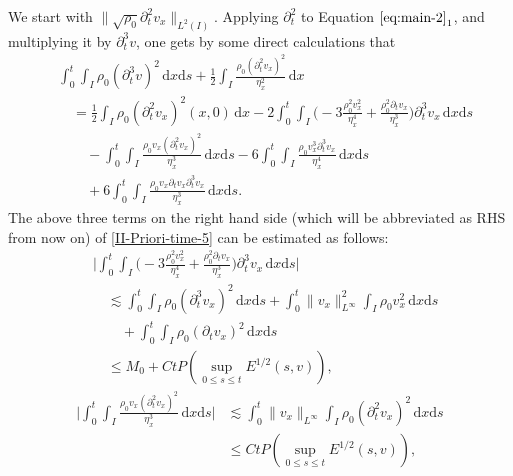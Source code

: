 \documentclass[11pt, reqno]{amsart}
\newcommand{\diff}{\mathrm{d}}
\numberwithin{equation}{section}
\begin{document}
\bigskip
{}
We start with \(\|\sqrt{\rho_0}\partial_t^2v_x\|_{L^2(I)}\).
Applying \(\partial_t^2\) to Equation \(\eqref{eq:main-2}_1\),
and multiplying it by \(\partial_t^3v\), one gets by some direct calculations that
\begin{equation}\label{II-Priori-time-5}
\begin{aligned}
&\int_0^t\int_I \rho_0(\partial_t^3v)^2\,\diff x\diff s
+\frac{1}{2}\int_I\frac{\rho_0(\partial_t^2v_x)^2}{\eta_x^2}\,\diff x\\
&\quad=\frac{1}{2}\int_I\rho_0(\partial_t^2v_x)^2(x,0)\,\diff x-2\int_0^t\int_I\bigg(-3\frac{\rho_0^2v_x^2}{\eta_x^4}
+\frac{\rho_0^2\partial_tv_x}{\eta_x^3}\bigg)\partial_t^3v_x\,\diff x\diff s\\
&\qquad-\int_0^t\int_I\frac{\rho_0v_x(\partial_t^2v_x)^2}{\eta_x^3}\,\diff x\diff s
-6\int_0^t\int_I\frac{\rho_0v_x^3\partial_t^3v_x}{\eta_x^4}\,\diff x\diff s \\
&\qquad +6\int_0^t\int_I\frac{\rho_0v_x\partial_tv_x\partial_t^3v_x}{\eta_x^3}\,\diff x\diff s.
\end{aligned}
\end{equation}
The above three terms on the right hand side (which will be abbreviated as RHS from now on) of \eqref{II-Priori-time-5}  can be estimated as follows:
\begin{equation}\label{II-Priori-time-6}
\begin{aligned}
&\bigg|\int_0^t\int_I\bigg(-3\frac{\rho_0^2v_x^2}{\eta_x^4}
+\frac{\rho_0^2\partial_tv_x}{\eta_x^3}\bigg)\partial_t^3v_x\,\diff x\diff s\bigg|\\
&\quad\lesssim \int_0^t\int_I\rho_0(\partial_t^3v_x)^2\,\diff x\diff s+\int_0^t\|v_x\|_{L^\infty}^2\int_I\rho_0v_x^2\,\diff x\diff s\\
&\qquad+\int_0^t\int_I\rho_0(\partial_tv_x)^2\,\diff x\diff s\\
&\quad\leq M_0+Ct P(\sup_{0\leq s\leq t}E^{1/2}(s,v)),
\end{aligned}
\end{equation}
\begin{equation}\label{II-Priori-time-7}
\begin{aligned}
\bigg|\int_0^t\int_I\frac{\rho_0v_x(\partial_t^2v_x)^2}{\eta_x^3}\,\diff x\diff s\bigg|
&\lesssim \int_0^t\|v_x\|_{L^\infty}\int_I\rho_0(\partial_t^2v_x)^2\,\diff x\diff s\\
&\leq Ct P(\sup_{0\leq s\leq t}E^{1/2}(s,v)),
\end{aligned}
\end{equation}
\end{document}
